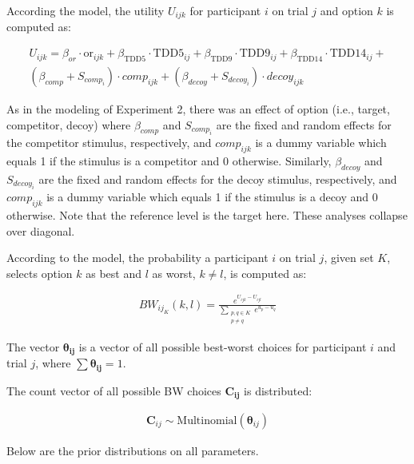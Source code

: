 According the model, the utility $U_{ijk}$ for participant $i$ on trial $j$ and option $k$ is computed as:

\begin{equation}
    \begin{aligned}
        U_{ijk}=\beta_{or} \cdot \mathrm{or}_{ijk} + \beta_{\mathrm{TDD}5} \cdot \mathrm{TDD}5_{ij} +\beta_{\mathrm{TDD}9} \cdot \mathrm{TDD}9_{ij} + \beta_{\mathrm{TDD}14} \cdot \mathrm{TDD}14_{ij}+\\
        (\beta_{comp}+S_{comp_i}) \cdot comp_{ijk}+(\beta_{decoy}+S_{decoy_i}) \cdot decoy_{ijk}
        \label{maxdiff_U}
    \end{aligned}
\end{equation}

As in the modeling of Experiment 2, there was an effect of option (i.e., target, competitor, decoy) where $\beta_{comp}$ and $S_{comp_i}$ are the fixed and random effects for the competitor stimulus, respectively, and $comp_{ijk}$ is a dummy variable which equals 1 if the stimulus is a competitor and 0 otherwise. Similarly, $\beta_{decoy}$ and $S_{decoy_i}$ are the fixed and random effects for the decoy stimulus, respectively, and $comp_{ijk}$ is a dummy variable which equals 1 if the stimulus is a decoy and 0 otherwise. Note that the reference level is the target here. These analyses collapse over diagonal.

According to the model, the probability a participant $i$ on trial $j$, given set $K$, selects option $k$ as best and $l$ as worst, $k \neq l$, is computed as:

\begin{align}
    BW_{ij_{K}}(k,l)=\frac{e^{U_{ijk}-U_{ijl}}}{\sum_{\substack{{p,q}\in K\\p \neq q}} e^{u_{p}-u_{q}}}
\end{align}

The vector $\boldsymbol{\theta_{ij}}$ is a vector of all possible best-worst choices for participant $i$ and trial $j$, where $\sum \boldsymbol{\theta_{ij}} = 1$.

The count vector of all possible BW choices $\boldsymbol{C_{ij}}$ is distributed:

\begin{align}
    \boldsymbol{C}_{ij} \sim \text{Multinomial}(\boldsymbol{\theta}_{ij})
\end{align}


Below are the prior distributions on all parameters.

